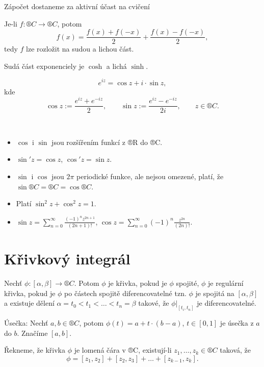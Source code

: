 \documentclass[12pt]{article}					%
\begin{document}
\begin{poznamka}[Zápočet]
	Zápočet dostaneme za aktivní účast na cvičení
\end{poznamka}


\begin{poznamka}
	Je-li $f: ®C \rightarrow ®C$, potom
	$$ f(x) = \frac{f(x) + f(-x)}{2} + \frac{f(x) - f(-x)}{2}, $$
	tedy $f$ lze rozložit na sudou a lichou část.

	Sudá část exponenciely je $\cosh$ a lichá $\sinh$.
\end{poznamka}

\begin{definice}
	$$ e^{iz} = \cos z + i·\sin z, $$
	kde
	$$ \cos z := \frac{e^{iz} + e^{-iz}}{2}, \qquad \sin z := \frac{e^{iz} - e^{-iz}}{2i}, \qquad z \in ®C. $$
\end{definice}

\begin{tvrzeni}[Vlastnosti]
	\ 
	\begin{itemize}
		\item $\cos$ i $\sin$ jsou rozšířením funkcí z ®R do ®C.
		\item $\sin' z = \cos z$, $\cos' z = \sin z$.
		\item $\sin$ i $\cos$ jsou $2\pi$ periodické funkce, ale nejsou omezené, platí, že $\sin ®C = ®C = \cos ®C$.
		\item Platí $\sin^2 z + \cos^2 z = 1$.
		\item $\sin z = \sum_{n=0}^{∞} \frac{(-1)^n z^{2n + 1}}{(2n + 1)!}$, $\cos z = \sum_{n=0}^∞ (-1)^n \frac{z^{2n}}{(2n)!}$.
	\end{itemize}
\end{tvrzeni}

\section{Křivkový integrál}
\begin{definice}[Značení]
	Nechť $\phi:[\alpha, \beta] \rightarrow ®C$. Potom $\phi$ je křivka, pokud je $\phi$ spojité, $\phi$ je regulární křivka, pokud je $\phi$ po částech spojitě diferencovatelné tzn. $\phi$ je spojitá na $[\alpha, \beta]$ a existuje dělení $\alpha = t_0 < t_1 < … < t_n = \beta$ takové, že $\phi|_{[t_i, t_n]}$ je diferencovatelné.

	Úsečka: Nechť $a, b \in ®C$, potom $\phi(t) = a + t·(b - a)$, $t \in [0, 1]$ je úsečka z $a$ do $b$. Značíme $[a, b]$.

	Řekneme, že křivka $\phi$ je lomená čára v ®C, existují-li $z_1, …, z_k \in ®C$ taková, že
	$$ \phi = [z_1, z_2] + [z_2, z_3] + … + [z_{k-1}, z_k]. $$
\end{definice}
\end{document}
